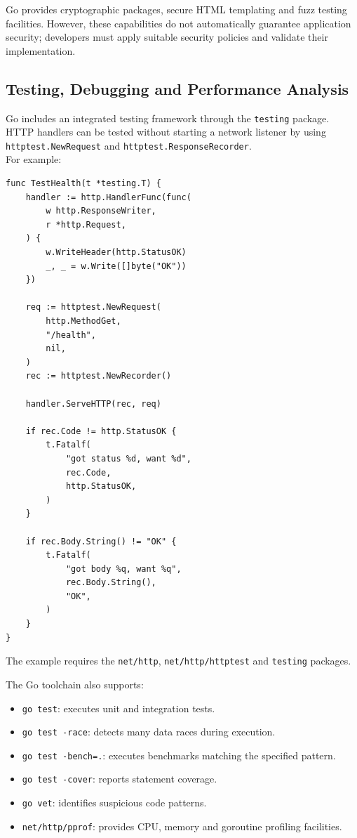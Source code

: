 Go provides cryptographic packages, secure HTML templating and fuzz testing facilities. However, these capabilities do not automatically guarantee application security; developers must apply suitable security policies and validate their implementation.\\

\subsection{Testing, Debugging and Performance Analysis}

Go includes an integrated testing framework through the \texttt{testing} package. HTTP handlers can be tested without starting a network listener by using \texttt{httptest.NewRequest} and \texttt{httptest.ResponseRecorder}.\\

For example:

\begin{lstlisting}
func TestHealth(t *testing.T) {
    handler := http.HandlerFunc(func(
        w http.ResponseWriter,
        r *http.Request,
    ) {
        w.WriteHeader(http.StatusOK)
        _, _ = w.Write([]byte("OK"))
    })

    req := httptest.NewRequest(
        http.MethodGet,
        "/health",
        nil,
    )
    rec := httptest.NewRecorder()

    handler.ServeHTTP(rec, req)

    if rec.Code != http.StatusOK {
        t.Fatalf(
            "got status %d, want %d",
            rec.Code,
            http.StatusOK,
        )
    }

    if rec.Body.String() != "OK" {
        t.Fatalf(
            "got body %q, want %q",
            rec.Body.String(),
            "OK",
        )
    }
}
\end{lstlisting}

The example requires the \texttt{net/http}, \texttt{net/http/httptest} and \texttt{testing} packages.

The Go toolchain also supports:

\begin{itemize}
    \item \texttt{go test}: executes unit and integration tests.
    \item \texttt{go test -race}: detects many data races during execution.
    \item \texttt{go test -bench=.}: executes benchmarks matching the specified pattern.
    \item \texttt{go test -cover}: reports statement coverage.
    \item \texttt{go vet}: identifies suspicious code patterns.
    \item \texttt{net/http/pprof}: provides CPU, memory and goroutine profiling facilities.
\end{itemize}

